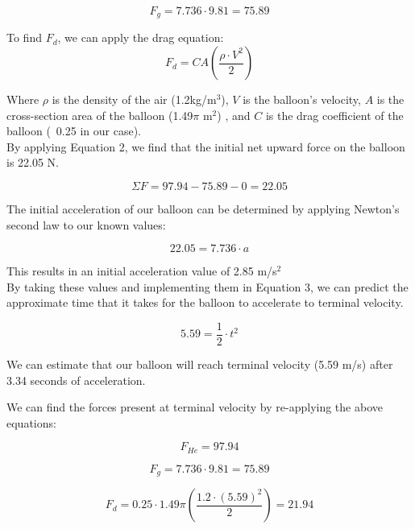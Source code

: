 \documentclass[useAMS,usenatbib]{mn2e}
\begin{document}
\begin{equation}
F_g = 7.736 \cdot 9.81 = 75.89
\end{equation}

To find $F_d$, we can apply the drag equation:
\begin{equation}
F_d = C A(\frac{\rho \cdot V^2}{2})
\end{equation}

Where $\rho$ is the density of the air (1.2kg/m$^3$), $V$ is the balloon's velocity, $A$ is the cross-section area of the balloon (1.49$\pi$ m$^2$) , and $C$ is the drag coefficient of the balloon (~0.25 in our case).\\



By applying Equation 2, we find that the initial net upward force on the balloon is 22.05 N.

\begin{equation}
\Sigma F = 97.94 - 75.89 - 0 = 22.05
\end{equation}

The initial acceleration of our balloon can be determined by applying Newton's second law to our known values:

\begin{equation}
22.05 = 7.736 \cdot a
\end{equation}

This results in an initial acceleration value of 2.85 m/s$^2$\\

By taking these values and implementing them in Equation 3, we can predict the approximate time that it takes for the balloon to accelerate to terminal velocity.

\begin{equation}
5.59 = \frac{1}{2} \cdot  t^2
\end{equation}

We can estimate that our balloon will reach terminal velocity (5.59 m/s) after 3.34 seconds of acceleration.

We can find the forces present at terminal velocity by re-applying the above equations:

\begin{equation}
F_{He} = 97.94
\end{equation}

\begin{equation}
F_g = 7.736 \cdot 9.81 = 75.89
\end{equation}

\begin{equation}
F_d = 0.25 \cdot 1.49 \pi (\frac{1.2\cdot(5.59)^2}{2}) = 21.94
\end{equation}
\end{document}

